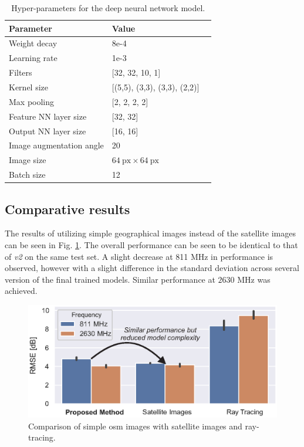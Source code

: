 \begin{table}[]
    \centering
    \footnotesize
    \caption{Hyper-parameters for the deep neural network model.}\label{tab:hyper-parameters}
    \begin{tabular}{@{}lll@{}}
    \toprule
    \textbf{Parameter}          & \textbf{Value}                &  \\ \midrule
    Weight decay                & 8e-4                          &  \\
    Learning rate               & 1e-3                          &  \\
    Filters                     & [32, 32, 10, 1]               &  \\
    Kernel size                 & [(5,5), (3,3), (3,3), (2,2)]  &  \\
    Max pooling                 & [2, 2, 2, 2]                  &  \\
    Feature NN layer size       & [32, 32]                      &  \\
    Output NN layer size        & [16, 16]                      & \\
    Image augmentation angle    & 20                            & \\
    Image size                  & $64~\text{px} \times 64~\text{px}$                & \\
    Batch size                  & 12                            &  \\ \bottomrule
\end{tabular}
\end{table}

\newpage
\newpage


\subsection{Comparative results}
The results of utilizing simple geographical images instead of the satellite images can be seen in Fig. \ref{fig:model_comparison_access}. The overall performance can be seen to be identical to that of \emph{v2} on the same test set. A slight decrease at 811 MHz in performance is observed, however with a slight difference in the standard deviation across several version of the final trained models. Similar performance at $2630$ MHz was achieved.

\begin{figure}[h]
    \centering
    \includegraphics{chapters/part_pathloss/osm_images_paper/figures/model_comparison_access.eps}
    \caption{Comparison of simple \gls{osm} images with satellite images and ray-tracing.}
    \label{fig:model_comparison_access}
\end{figure}



